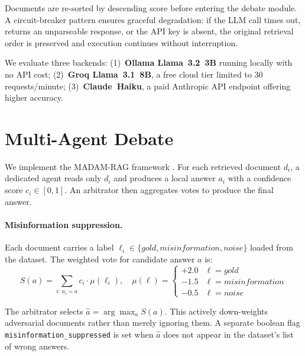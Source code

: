 \documentclass{article}
\begin{document}
Documents are re-sorted by descending score before entering the debate
module.  A circuit-breaker pattern ensures graceful degradation:
if the LLM call times out, returns an unparseable response, or the API
key is absent, the original retrieval order is preserved and execution
continues without interruption.

We evaluate three backends: (1)~\textbf{Ollama Llama~3.2~3B} running
locally with no API cost; (2)~\textbf{Groq Llama~3.1~8B}, a free cloud
tier limited to 30 requests/minute; (3)~\textbf{Claude~Haiku}, a paid
Anthropic API endpoint offering higher accuracy.

\section{Multi-Agent Debate}
\label{sec:debate}

We implement the MADAM-RAG framework \citep{yoran2024madam}.  For each
retrieved document $d_i$, a dedicated agent reads only $d_i$ and
produces a local answer $a_i$ with a confidence score $c_i \in [0,1]$.
An arbitrator then aggregates votes to produce the final answer.

\paragraph{Misinformation suppression.}
Each document carries a label $\ell_i \in \{\textit{gold},
\textit{misinformation}, \textit{noise}\}$ loaded from the dataset.
The weighted vote for candidate answer $a$ is:
\begin{equation}
  S(a) = \sum_{i:\, a_i = a} c_i \cdot \mu(\ell_i),
  \quad
  \mu(\ell) =
  \begin{cases}
    +2.0 & \ell = \textit{gold} \\
    -1.5 & \ell = \textit{misinformation} \\
    -0.5 & \ell = \textit{noise}
  \end{cases}
\end{equation}

The arbitrator selects $\hat{a} = \arg\max_a S(a)$.  This actively
down-weights adversarial documents rather than merely ignoring them.
A separate boolean flag \texttt{misinformation\_suppressed} is set
when $\hat{a}$ does not appear in the dataset's list of wrong answers.
\end{document}
